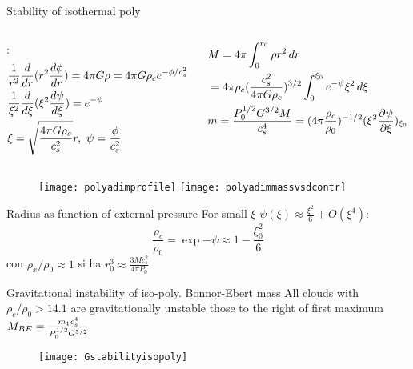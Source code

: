 \begin{frame}{Stability of isothermal poly}
\begin{columns}[T]\begin{column}{0.5\textwidth}
:
\begin{align*}
&\frac{1}{r^2}\frac{d}{d r}(r^2\frac{d \phi}{d r})=4\pi G\rho=4\pi G\rho_ce^{-\phi/c_s^2}\\
&\frac{1}{\xi^2}\frac{d}{d \xi}(\xi^2\frac{d \psi}{d \xi})=e^{-\psi}\\
&\xi=\sqrt{\frac{4\pi G\rho_c}{c_s^2}}r,\ \psi=\frac{\phi}{c_s^2}
\end{align*}
\end{column}\begin{column}{0.5\textwidth}
\begin{align*}
&M=4\pi\int_0^{r_0}\rho r^2\,dr\\
&=4\pi\rho_c(\frac{c_s^2}{4\pi G\rho_c})^{3/2}\int_0^{\xi_0}e^{-\psi}\xi^2\,d\xi\\
&m=\frac{P_0^{1/2}G^{3/2}M}{c_s^4}=(4\pi\frac{\rho_c}{\rho_0})^{-1/2}(\xi^2\frac{\partial \psi}{\partial \xi})_{\xi_0}
\end{align*}
\end{column}\end{columns}
\begin{figure}
\texttt{[image: polyadimprofile]}
\texttt{[image: polyadimmassvsdcontr]}
\end{figure}
\end{frame}

\begin{wordonframe}{Radius as function of external pressure}
For small $\xi$ $\psi(\xi)\approx\frac{\xi^2}{6}+O(\xi^4)$:
\begin{equation*}
\frac{\rho_c}{\rho_0}=\exp{-\psi}\approx1-\frac{\xi_0^2}{6}
\end{equation*}
con $\rho_x/\rho_0\approx1$ si ha $r_0^3\approx\frac{3Mc_s^2}{4\pi P_0}$
\end{wordonframe}

\begin{frame}{Gravitational instability of iso-poly. Bonnor-Ebert mass}
All clouds with $\rho_c/\rho_0>14.1$ are gravitationally unstable those to the right of first maximum $M_{BE}=\frac{m_1c_s^4}{P_0^{1/2}G^{3/2}}$
\begin{figure}[!ht]\texttt{[image: Gstabilityisopoly]}\label{fig:Gstabilityisopoly}\end{figure}
\end{frame}


